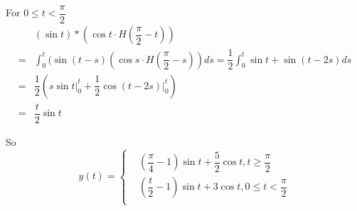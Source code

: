 \documentclass[a4paper,12pt,titlepage]{article}
\begin{document}
For $0\leqslant t<\dfrac{\pi}{2}$
\begin{align*}
&(\sin t)*(\cos t\cdot H(\dfrac{\pi}{2}-t))\\
=&\int_0^t (\sin (t-s)(\cos s\cdot H(\dfrac{\pi}{2}-s))ds =\dfrac{1}{2}\int_0^{t} \sin t+\sin(t-2s) ds\\
=&\dfrac{1}{2} (s\sin t\big|_0^{t}+\dfrac{1}{2}\cos(t-2s)\big|_0^{t})\\
=&\dfrac{t}{2}\sin t
\end{align*}

So 
$$y(t)=\left\{
\begin{aligned}
&(\dfrac{\pi}{4}-1)\sin t+\dfrac{5}{2}\cos t,t\geqslant \dfrac{\pi}{2}\\
&(\dfrac{t}{2}-1)\sin t+3\cos t,0\leqslant t<\dfrac{\pi}{2}\\
\end{aligned}
\right.
$$
\end{document}
